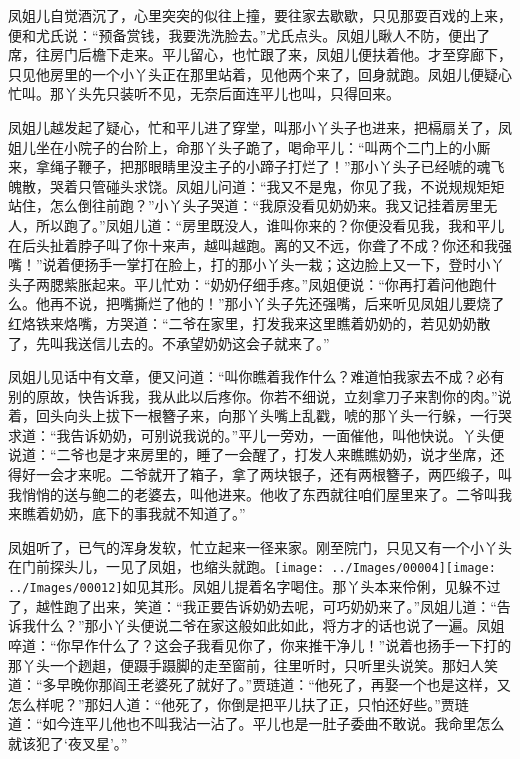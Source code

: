 凤姐儿自觉酒沉了，心里突突的似往上撞，要往家去歇歇，只见那耍百戏的上来，便和尤氏说：``预备赏钱，我要洗洗脸去。''尤氏点头。凤姐儿瞅人不防，便出了席，往房门后檐下走来。平儿留心，也忙跟了来，凤姐儿便扶着他。才至穿廊下，只见他房里的一个小丫头正在那里站着，见他两个来了，回身就跑。凤姐儿便疑心忙叫。那丫头先只装听不见，无奈后面连平儿也叫，只得回来。

凤姐儿越发起了疑心，忙和平儿进了穿堂，叫那小丫头子也进来，把槅扇关了，凤姐儿坐在小院子的台阶上，命那丫头子跪了，喝命平儿：``叫两个二门上的小厮来，拿绳子鞭子，把那眼睛里没主子的小蹄子打烂了！''那小丫头子已经唬的魂飞魄散，哭着只管碰头求饶。凤姐儿问道：``我又不是鬼，你见了我，不说规规矩矩站住，怎么倒往前跑？''小丫头子哭道：``我原没看见奶奶来。我又记挂着房里无人，所以跑了。''凤姐儿道：``房里既没人，谁叫你来的？你便没看见我，我和平儿在后头扯着脖子叫了你十来声，越叫越跑。离的又不远，你聋了不成？你还和我强嘴！''说着便扬手一掌打在脸上，打的那小丫头一栽；这边脸上又一下，登时小丫头子两腮紫胀起来。平儿忙劝：``奶奶仔细手疼。''凤姐便说：``你再打着问他跑什么。他再不说，把嘴撕烂了他的！''那小丫头子先还强嘴，后来听见凤姐儿要烧了红烙铁来烙嘴，方哭道：``二爷在家里，打发我来这里瞧着奶奶的，若见奶奶散了，先叫我送信儿去的。不承望奶奶这会子就来了。''

凤姐儿见话中有文章，便又问道：``叫你瞧着我作什么？难道怕我家去不成？必有别的原故，快告诉我，我从此以后疼你。你若不细说，立刻拿刀子来割你的肉。''说着，回头向头上拔下一根簪子来，向那丫头嘴上乱戳，唬的那丫头一行躲，一行哭求道：``我告诉奶奶，可别说我说的。''平儿一旁劝，一面催他，叫他快说。丫头便说道：``二爷也是才来房里的，睡了一会醒了，打发人来瞧瞧奶奶，说才坐席，还得好一会才来呢。二爷就开了箱子，拿了两块银子，还有两根簪子，两匹缎子，叫我悄悄的送与鲍二的老婆去，叫他进来。他收了东西就往咱们屋里来了。二爷叫我来瞧着奶奶，底下的事我就不知道了。''

凤姐听了，已气的浑身发软，忙立起来一径来家。刚至院门，只见又有一个小丫头在门前探头儿，一见了凤姐，也缩头就跑。{\texttt{[image: ../Images/00004]}\texttt{[image: ../Images/00012]}\footnotesize \kaishu 如见其形。}凤姐儿提着名字喝住。那丫头本来伶俐，见躲不过了，越性跑了出来，笑道：``我正要告诉奶奶去呢，可巧奶奶来了。''凤姐儿道：``告诉我什么？''那小丫头便说二爷在家这般如此如此，将方才的话也说了一遍。凤姐啐道：``你早作什么了？这会子我看见你了，你来推干净儿！''说着也扬手一下打的那丫头一个趔趄，便蹑手蹑脚的走至窗前，往里听时，只听里头说笑。那妇人笑道：``多早晚你那阎王老婆死了就好了。''贾琏道：``他死了，再娶一个也是这样，又怎么样呢？''那妇人道：``他死了，你倒是把平儿扶了正，只怕还好些。''贾琏道：``如今连平儿他也不叫我沾一沾了。平儿也是一肚子委曲不敢说。我命里怎么就该犯了`夜叉星'。''

